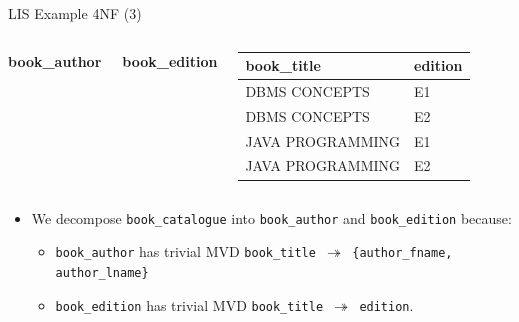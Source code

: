 \documentclass[aspectratio=169, xcolor=dvipsnames]{beamer}
\begin{document}
\begin{frame}{LIS Example 4NF (3)}
    \begin{columns}
        \textbf{book\_author}
        \begin{table}
        \end{table}
        \textbf{book\_edition}
        \begin{table}
        \begin{tabular}{ll}
        \toprule
        \textbf{book\_title} & \textbf{edition} \\
        \midrule
        DBMS CONCEPTS & E1 \\
        DBMS CONCEPTS & E2 \\
        JAVA PROGRAMMING & E1 \\
        JAVA PROGRAMMING & E2 \\
        \bottomrule
        \end{tabular}
        \end{table}
    \end{columns}
    \vspace{0.5em}
    \begin{itemize}
        \item We decompose \texttt{book\_catalogue} into \texttt{book\_author} and \texttt{book\_edition} because:
        \begin{itemize}
            \item \texttt{book\_author} has trivial MVD \texttt{book\_title $\twoheadrightarrow$ \{author\_fname, author\_lname\}}
            \item \texttt{book\_edition} has trivial MVD \texttt{book\_title $\twoheadrightarrow$ edition}.
        \end{itemize}
    \end{itemize}
\end{frame}
\end{document}
